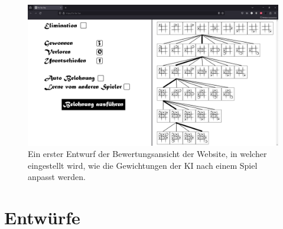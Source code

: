 \documentclass[titlepage]{scrartcl}
\begin{document}
\begin{figure}[ht]
\includegraphics[width=\textwidth]{tictactoe_bewertungsansicht.png}
\caption{Ein erster Entwurf der Bewertungsansicht der Website, in welcher eingestellt wird, wie die Gewichtungen der KI nach einem Spiel anpasst werden.}
\end{figure}

\FloatBarrier
\section{Entwürfe}
\end{document}
